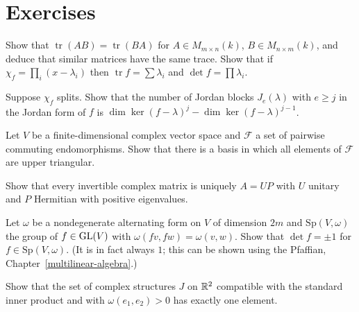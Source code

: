 \section{Exercises}\label{linear-algebra:section-exercises}

\begin{exercise}\label{linear-algebra:exercise-trace}
Show that $\operatorname{tr}(AB) = \operatorname{tr}(BA)$ for $A \in M_{m \times n}(k)$, $B \in M_{n \times m}(k)$, and deduce that similar
matrices have the same trace. Show that if $\chi_f = \prod_i (x - \lambda_i)$ then $\operatorname{tr} f = \sum \lambda_i$ and
$\det f = \prod \lambda_i$.
\end{exercise}

\begin{exercise}\label{linear-algebra:exercise-jordan-count}
Suppose $\chi_f$ splits. Show that the number of Jordan blocks $J_e(\lambda)$ with $e \geq j$ in the Jordan form of $f$
is $\dim\ker(f - \lambda)^j - \dim\ker(f - \lambda)^{j-1}$.
\end{exercise}

\begin{exercise}\label{linear-algebra:exercise-simultaneous-triangular}
Let $V$ be a finite-dimensional complex vector space and $\mathcal{F}$ a set of pairwise commuting endomorphisms.
Show that there is a basis in which all elements of $\mathcal{F}$ are upper triangular.
\end{exercise}

\begin{exercise}\label{linear-algebra:exercise-polar}
Show that every invertible complex matrix is uniquely $A = UP$ with $U$ unitary and $P$ Hermitian with positive
eigenvalues.
\end{exercise}

\begin{exercise}\label{linear-algebra:exercise-symplectic-determinant}
Let $\omega$ be a nondegenerate alternating form on $V$ of dimension $2m$ and $\mathrm{Sp}(V, \omega)$ the group of
$f \in \mathrm{GL}(V)$ with $\omega(fv, fw) = \omega(v, w)$. Show that $\det f = \pm 1$ for $f \in \mathrm{Sp}(V, \omega)$. (It is in fact
always $1$; this can be shown using the Pfaffian, Chapter~\ref{multilinear-algebra}.)
\end{exercise}

\begin{exercise}\label{linear-algebra:exercise-complex-structures-compatible}
Show that the set of complex structures $J$ on $\mathbb{R}^{2}$ compatible with the standard inner product and with
$\omega(e_1, e_2) > 0$ has exactly one element.
\end{exercise}

